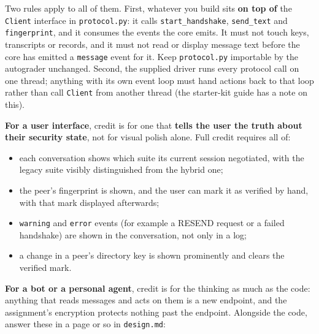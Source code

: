 \documentclass[11pt]{article}
\begin{document}
Two rules apply to all of them. First, whatever you build sits \textbf{on top of} the \texttt{Client} interface in \texttt{protocol.py}: it calls \texttt{start\_handshake}, \texttt{send\_text} and \texttt{fingerprint}, and it consumes the events the core emits. It must not touch keys, transcripts or records, and it must not read or display message text before the core has emitted a \texttt{message} event for it. Keep \texttt{protocol.py} importable by the autograder unchanged. Second, the supplied driver runs every protocol call on one thread; anything with its own event loop must hand actions back to that loop rather than call \texttt{Client} from another thread (the starter-kit guide has a note on this).

\textbf{For a user interface}, credit is for one that \textbf{tells the user the truth about their security state}, not for visual polish alone. Full credit requires all of:

\begin{itemize}
\item each conversation shows which suite its current session negotiated, with the legacy suite visibly distinguished from the hybrid one;
\item the peer's fingerprint is shown, and the user can mark it as verified by hand, with that mark displayed afterwards;
\item \texttt{warning} and \texttt{error} events (for example a RESEND request or a failed handshake) are shown in the conversation, not only in a log;
\item a change in a peer's directory key is shown prominently and clears the verified mark.
\end{itemize}
\textbf{For a bot or a personal agent}, credit is for the thinking as much as the code: anything that reads messages and acts on them is a new endpoint, and the assignment's encryption protects nothing past the endpoint. Alongside the code, answer these in a page or so in \texttt{design.md}:
\end{document}
